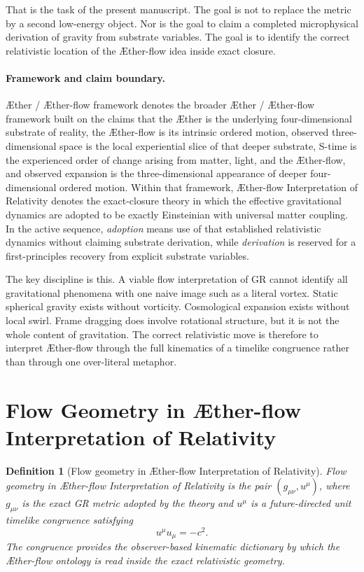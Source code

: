 \documentclass[11pt]{article}
\newcommand{\Aether}{\AE{}ther}
\newcommand{\Aflow}{\AE{}ther-flow}
\newcommand{\TheoryName}{\Aflow{} Interpretation of Relativity}
\newcommand{\TheoryProgram}{\Aether{} / \Aflow{} framework}
\newtheorem{definition}{Definition}
\begin{document}
That is the task of the present manuscript. The goal is not to replace the metric by a second low-energy object. Nor is the goal to claim a completed microphysical derivation of gravity from substrate variables. The goal is to identify the correct relativistic location of the \Aflow{} idea inside exact closure.

\paragraph{Framework and claim boundary.}
\TheoryProgram{} denotes the broader \Aether{} / \Aflow{} framework built on the claims that the \Aether{} is the underlying four-dimensional substrate of reality, the \Aflow{} is its intrinsic ordered motion, observed three-dimensional space is the local experiential slice of that deeper substrate, S-time is the experienced order of change arising from matter, light, and the \Aflow{}, and observed expansion is the three-dimensional appearance of deeper four-dimensional ordered motion. Within that framework, \TheoryName{} denotes the exact-closure theory in which the effective gravitational dynamics are adopted to be exactly Einsteinian with universal matter coupling. In the active sequence, \emph{adoption} means use of that established relativistic dynamics without claiming substrate derivation, while \emph{derivation} is reserved for a first-principles recovery from explicit substrate variables.

The key discipline is this. A viable flow interpretation of GR cannot identify all gravitational phenomena with one naive image such as a literal vortex. Static spherical gravity exists without vorticity. Cosmological expansion exists without local swirl. Frame dragging does involve rotational structure, but it is not the whole content of gravitation. The correct relativistic move is therefore to interpret \Aflow{} through the full kinematics of a timelike congruence rather than through one over-literal metaphor.

\section{Flow Geometry in \TheoryName{}}

\begin{definition}[Flow geometry in \TheoryName{}]
Flow geometry in \TheoryName{} is the pair \((g_{\mu\nu},u^\mu)\), where \(g_{\mu\nu}\) is the exact GR metric adopted by the theory and \(u^\mu\) is a future-directed unit timelike congruence satisfying
\begin{equation}
u^\mu u_\mu = -c^2.
\label{eq:unitnorm}
\end{equation}
The congruence provides the observer-based kinematic dictionary by which the \Aflow{} ontology is read inside the exact relativistic geometry.
\end{definition}
\end{document}
